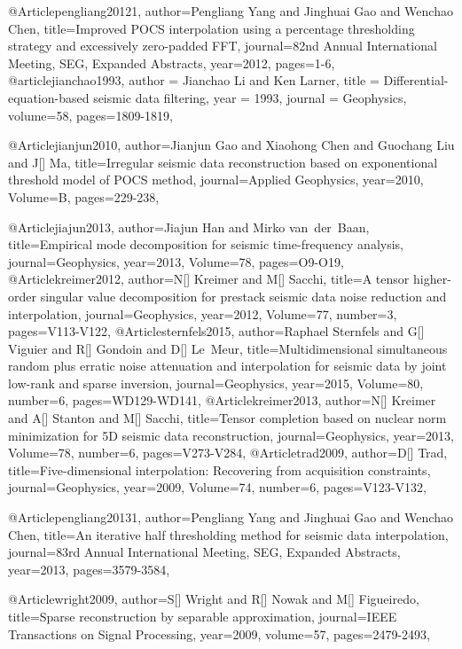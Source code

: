{@Article{pengliang20121,
  author={Pengliang Yang and Jinghuai Gao and Wenchao Chen},
  title={Improved {POCS} interpolation using a percentage thresholding strategy and excessively zero-padded FFT},
  journal={82nd Annual International Meeting, SEG, Expanded Abstracts},
  year=2012,
  pages={1-6},
}
@article{jianchao1993,
  author =	 {Jianchao Li and Ken Larner},
  title =	 {Differential-equation-based seismic data filtering},
  year =	 1993,
  journal =	 {Geophysics},
  volume={58},
 pages=1809-1819,
}

@Article{jianjun2010,
  author={Jianjun Gao and Xiaohong Chen and Guochang Liu and J[] Ma},
  title={Irregular seismic data reconstruction based on exponentional threshold model of {POCS} method},
  journal={Applied Geophysics},
  year=2010,
  Volume=B,
  pages={229-238},
}

@Article{jiajun2013,
  author={Jiajun Han and Mirko van~der~Baan},
  title={Empirical mode decomposition for seismic time-frequency analysis},
  journal={Geophysics},
  year=2013,
  Volume=78,
  pages={O9-O19},
}
@Article{kreimer2012,
  author={N[] Kreimer and M[] Sacchi},
  title={A tensor higher-order singular value decomposition for prestack seismic data noise reduction and interpolation},
  journal={Geophysics},
  year=2012,
  Volume=77,
  number=3,
  pages={V113-V122},
}
@Article{sternfels2015,
  author={Raphael Sternfels and G[] Viguier and R[] Gondoin and D[] Le~Meur},
  title={Multidimensional simultaneous random plus erratic noise attenuation and interpolation for seismic data by joint low-rank and sparse inversion},
  journal={Geophysics},
  year=2015,
  Volume=80,
  number=6,
  pages={WD129-WD141},
}
@Article{kreimer2013,
  author={N[] Kreimer and A[] Stanton and M[] Sacchi},
  title={Tensor completion based on nuclear norm minimization for 5{D} seismic data reconstruction},
  journal={Geophysics},
  year=2013,
  Volume=78,
  number=6,
  pages={V273-V284},
}
@Article{trad2009,
  author={D[] Trad},
  title={Five-dimensional interpolation: Recovering from acquisition constraints},
  journal={Geophysics},
  year=2009,
  Volume=74,
  number=6,
  pages={V123-V132},
}

@Article{pengliang20131,
  author={Pengliang Yang and Jinghuai Gao and Wenchao Chen},
  title={An iterative half thresholding method for seismic data interpolation},
  journal={83rd Annual International Meeting, SEG, Expanded Abstracts},
  year=2013,
  pages={3579-3584},
}

@Article{wright2009,
  author={S[] Wright and R[] Nowak and M[] Figueiredo},
  title={Sparse reconstruction by separable approximation},
  journal={IEEE Transactions on Signal Processing},
  year=2009,
  volume=57,
  pages={2479-2493},
}

}
